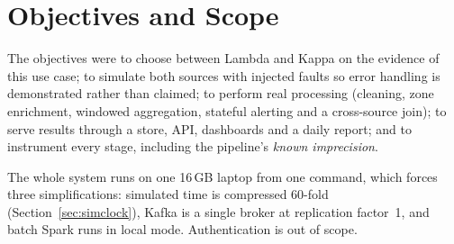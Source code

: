\section{Objectives and Scope}
\label{sec:objectives}

The objectives were to choose between Lambda and Kappa on the evidence of
this use case; to simulate both sources with injected faults so error
handling is demonstrated rather than claimed; to perform real processing
(cleaning, zone enrichment, windowed aggregation, stateful alerting and a
cross-source join); to serve results through a store, API, dashboards and
a daily report; and to instrument every stage, including the pipeline's
\emph{known imprecision}.

The whole system runs on one 16\,GB laptop from one command, which forces
three simplifications: simulated time is compressed 60-fold
(Section~\ref{sec:simclock}), Kafka is a single broker at replication
factor~1, and batch Spark runs in local mode. Authentication is out of
scope.
